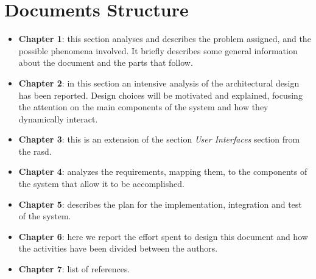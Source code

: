 \section{Documents Structure}

\begin{itemize}
	\item \textbf{Chapter 1}: this section analyses and describes the problem assigned, and the possible phenomena involved. It briefly describes some general information about the document and the parts that follow.
	\item \textbf{Chapter 2}: in this section an intensive analysis of the architectural design has been reported. Design choices will be motivated and explained, focusing the attention on the main components of the system and how they dynamically interact.
	\item \textbf{Chapter 3}: this is an extension of the section \textit{User Interfaces} section from the \gls{rasd}.
	\item \textbf{Chapter 4}: analyzes the requirements, mapping them, to the components of the system that allow it to be accomplished.
	\item \textbf{Chapter 5}: describes the plan for the implementation, integration and test of the system.
	\item \textbf{Chapter 6}: here we report the effort spent to design this document and how the activities have been divided between the authors.
	\item \textbf{Chapter 7}: list of references.
\end{itemize}